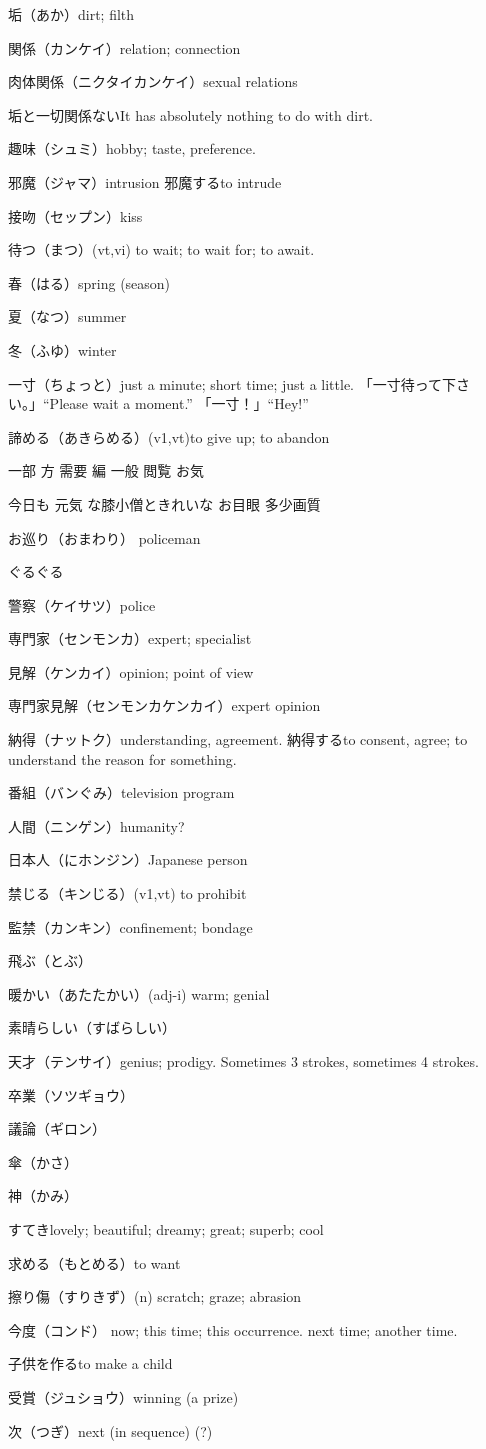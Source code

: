 垢（あか）dirt; filth

関係（カンケイ）relation; connection

肉体関係（ニクタイカンケイ）sexual relations

垢と一切関係ないIt has absolutely nothing to do with dirt.

趣味（シュミ）hobby; taste, preference.

邪魔（ジャマ）intrusion
邪魔するto intrude

接吻（セップン）kiss

待つ（まつ）(vt,vi) to wait; to wait for; to await.

春（はる）spring (season)

夏（なつ）summer

冬（ふゆ）winter

一寸（ちょっと）just a minute; short time; just a little.
「一寸待って下さい。」``Please wait a moment.''
「一寸！」``Hey!''

諦める（あきらめる）(v1,vt)to give up; to abandon

一部
方
需要
編
一般
閲覧
お気

今日も
元気
な膝小僧ときれいな
お目眼
多少画質

お巡り（おまわり）
policeman

ぐるぐる

警察（ケイサツ）police

専門家（センモンカ）expert; specialist

見解（ケンカイ）opinion; point of view

専門家見解（センモンカケンカイ）expert opinion

納得（ナットク）understanding, agreement.
納得するto consent, agree; to understand the reason for something.

番組（バンぐみ）television program

人間（ニンゲン）humanity?

日本人（にホンジン）Japanese person

禁じる（キンじる）(v1,vt) to prohibit

監禁（カンキン）confinement; bondage


飛ぶ（とぶ）

暖かい（あたたかい）(adj-i) warm; genial

素晴らしい（すばらしい）

天才（テンサイ）genius; prodigy.
Sometimes 3 strokes, sometimes 4 strokes.

卒業（ソツギョウ）

議論（ギロン）

傘（かさ）

神（かみ）

すてきlovely; beautiful; dreamy; great; superb; cool

求める（もとめる）to want

擦り傷（すりきず）(n) scratch; graze; abrasion

今度（コンド）
now; this time; this occurrence.
next time; another time.

子供を作るto make a child

受賞（ジュショウ）winning (a prize)

次（つぎ）next (in sequence) (?)
